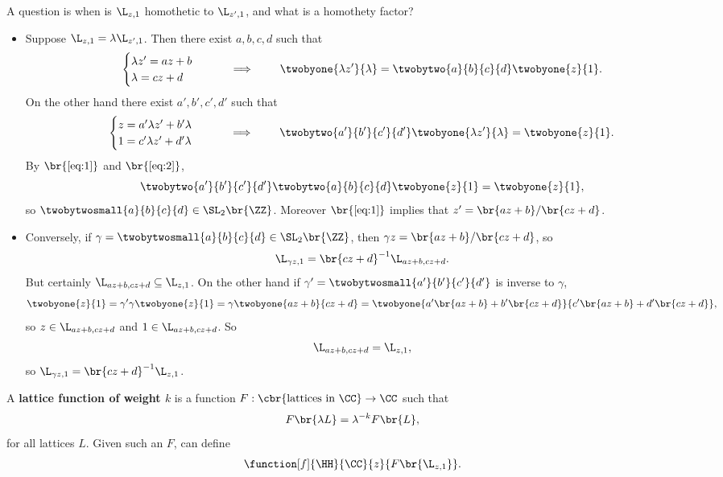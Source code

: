 A question is when is $ \L_{z, 1} $ homothetic to $ \L_{z', 1} $, and what is a homothety factor?
\begin{itemize}
\item Suppose $ \L_{z, 1} = \lambda \L_{z', 1} $. Then there exist $ a, b, c, d $ such that
\begin{equation}
\label{eq:1}
\begin{cases}
\lambda z' = az + b \\
\lambda = cz + d
\end{cases}
\qquad \implies \qquad \twobyone{\lambda z'}{\lambda} = \twobytwo{a}{b}{c}{d}\twobyone{z}{1}.
\end{equation}
On the other hand there exist $ a', b', c', d' $ such that
\begin{equation}
\label{eq:2}
\begin{cases}
z = a'\lambda z' + b'\lambda \\
1 = c'\lambda z' + d'\lambda
\end{cases}
\qquad \implies \qquad \twobytwo{a'}{b'}{c'}{d'}\twobyone{\lambda z'}{\lambda} = \twobyone{z}{1}.
\end{equation}
By $ \br{\ref{eq:1}} $ and $ \br{\ref{eq:2}} $,
$$ \twobytwo{a'}{b'}{c'}{d'}\twobytwo{a}{b}{c}{d}\twobyone{z}{1} = \twobyone{z}{1}, $$
so $ \twobytwosmall{a}{b}{c}{d} \in \SL_2\br{\ZZ} $. Moreover $ \br{\ref{eq:1}} $ implies that $ z' = \br{az + b} / \br{cz + d} $.
\item Conversely, if $ \gamma = \twobytwosmall{a}{b}{c}{d} \in \SL_2\br{\ZZ} $, then $ \gamma z = \br{az + b} / \br{cz + d} $, so
$$ \L_{\gamma z, 1} = \br{cz + d}^{-1}\L_{az + b, cz + d}. $$
But certainly $ \L_{az + b, cz + d} \subseteq \L_{z, 1} $. On the other hand if $ \gamma' = \twobytwosmall{a'}{b'}{c'}{d'} $ is inverse to $ \gamma $,
$$ \twobyone{z}{1} = \gamma'\gamma\twobyone{z}{1} = \gamma\twobyone{az + b}{cz + d} = \twobyone{a'\br{az + b} + b'\br{cz + d}}{c'\br{az + b} + d'\br{cz + d}}, $$
so $ z \in \L_{az + b, cz + d} $ and $ 1 \in \L_{az + b, cz + d} $. So
$$ \L_{az + b, cz + d} = \L_{z, 1}, $$
so $ \L_{\gamma z, 1} = \br{cz + d}^{-1}\L_{z, 1} $.
\end{itemize}

\begin{definition}
A \textbf{lattice function of weight $ k $} is a function $ F : \cbr{\text{lattices in} \ \CC} \to \CC $ such that
$$ F\br{\lambda L} = \lambda^{-k}F\br{L}, $$
for all lattices $ L $. Given such an $ F $, can define
$$ \function[f]{\HH}{\CC}{z}{F\br{\L_{z, 1}}}. $$
\end{definition}

